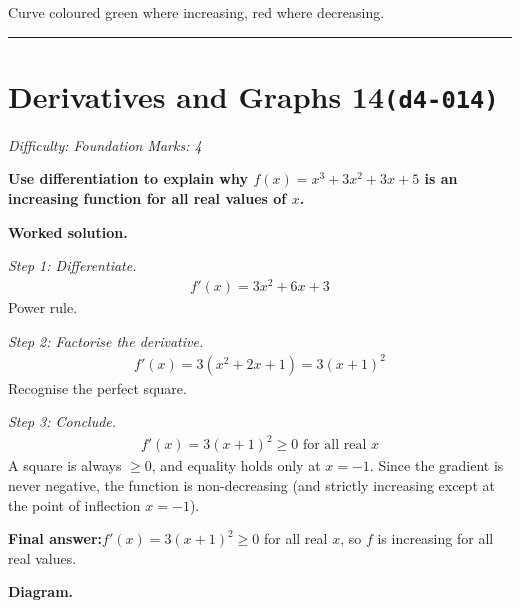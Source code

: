 \documentclass[11pt]{article}
\newcommand{\question}[1]{\par\medskip\noindent\textbf{#1}\par}
\begin{document}
\small Curve coloured green where increasing, red where decreasing.\normalsize

\medskip\hrule

\section*{Derivatives and Graphs 14\quad\small\texttt{(d4-014)}}
\textit{Difficulty: Foundation \quad\textbar\quad Marks: 4}

\question{Use differentiation to explain why \( f(x) = x^3 + 3x^2 + 3x + 5 \) is an increasing function for all real values of \( x \).}

\textbf{Worked solution.}

\textit{Step 1: Differentiate.}
\[\begin{gathered}
f'(x) = 3x^2 + 6x + 3
\end{gathered}\]
Power rule.

\textit{Step 2: Factorise the derivative.}
\[\begin{gathered}
f'(x) = 3(x^2 + 2x + 1) = 3(x + 1)^2
\end{gathered}\]
Recognise the perfect square.

\textit{Step 3: Conclude.}
\[\begin{gathered}
f'(x) = 3(x+1)^2 \geq 0 \text{ for all real } x
\end{gathered}\]
A square is always \( \geq 0 \), and equality holds only at \( x = -1 \). Since the gradient is never negative, the function is non-decreasing (and strictly increasing except at the point of inflection \( x = -1 \)).

\begin{answerbox}
\textbf{Final answer:}\quad \(\displaystyle  f'(x) = 3(x+1)^2 \geq 0 \) for all real \(\displaystyle  x \), so \(\displaystyle  f \) is increasing for all real values.
\end{answerbox}
\textbf{Diagram.}
\end{document}
